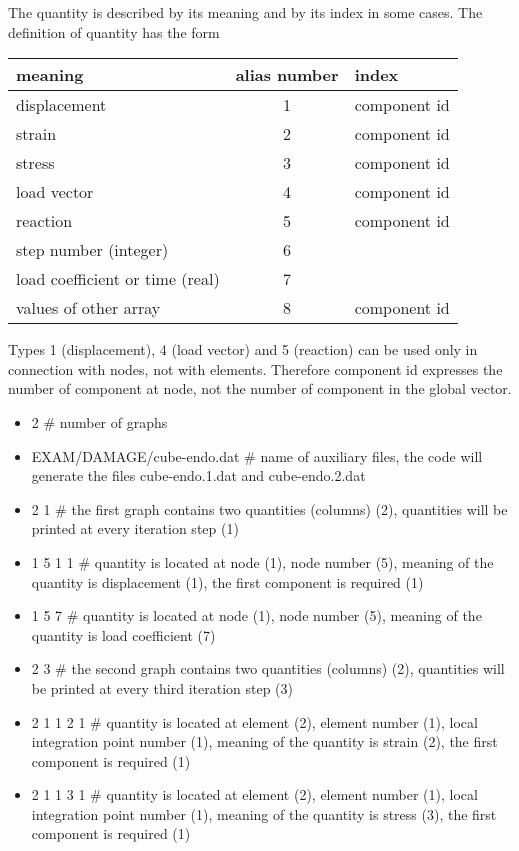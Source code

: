 The quantity is described by its meaning and by its index in some cases. The definition of quantity has the form

\begin{center}
\begin{tabular}{|l|c|l|}
\hline
meaning & alias number & index
\\ \hline \hline
displacement & 1 & component id
\\ \hline
strain & 2 & component id
\\ \hline
stress & 3 & component id
\\ \hline
load vector & 4 & component id
\\ \hline
reaction & 5 & component id
\\ \hline
step number (integer) & 6 &
\\ \hline
load coefficient or time (real) & 7 &
\\ \hline
values of other array & 8 & component id
\\ \hline
\end{tabular}
\end{center}
Types 1 (displacement), 4 (load vector) and 5 (reaction) can be used only in connection with nodes, not
with elements. Therefore component id expresses the number of component at node, not the number of
component in the global vector.

\begin{itemize}
\item[]
2 \# number of graphs
\item[]
EXAM/DAMAGE/cube-endo.dat \# name of auxiliary files, the code will generate the files cube-endo.1.dat
and cube-endo.2.dat
\item[]
2 1 \# the first graph contains two quantities (columns) (2), quantities will be printed at every iteration step (1)
\item[]
1 5 1 1 \# quantity is located at node (1), node number (5), meaning of the quantity is displacement (1), the first
component is required (1)
\item[]
1 5 7 \# quantity is located at node (1), node number (5), meaning of the quantity is load coefficient (7)
\item[]
2 3 \# the second graph contains two quantities (columns) (2), quantities will be printed at every third
iteration step (3)
\item[]
2 1 1 2 1 \# quantity is located at element (2), element number (1), local integration point number (1),
meaning of the quantity is strain (2), the first component is required (1)
\item[]
2 1 1 3 1 \# quantity is located at element (2), element number (1), local integration point number (1),
meaning of the quantity is stress (3), the first component is required (1)
\end{itemize}
